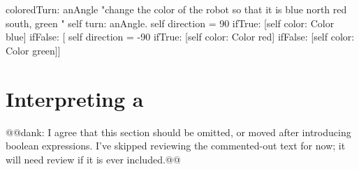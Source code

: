 {\begin{method}\label{mth:correctcoloredTurn}
coloredTurn: anAngle
   "change the color of the robot so that it is blue   
   north red  south,  green "
   self turn: anAngle.
   self direction = 90
      ifTrue: [self color: Color blue]
      ifFalse: [ self direction = -90
         ifTrue: [self color: Color red]
         ifFalse: [self color: Color green]]
\end{method}

\section{Interpreting a }

@@dank: I agree that this section should be omitted, or moved after introducing boolean expressions.  I've skipped reviewing the commented-out text for now; it will need review if it is ever included.@@



}
